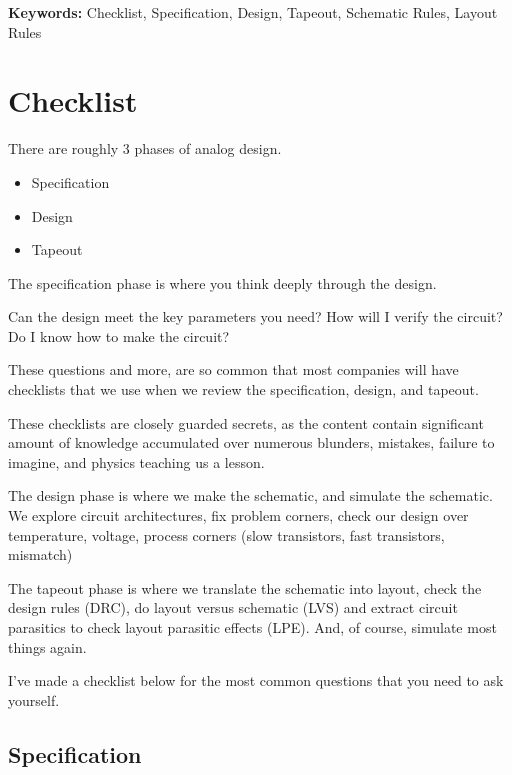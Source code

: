 \textbf{Keywords:} Checklist, Specification, Design, Tapeout, Schematic
Rules, Layout Rules

\section{Checklist}\label{checklist}

There are roughly 3 phases of analog design.

\begin{itemize}
\tightlist
\item
  Specification
\item
  Design
\item
  Tapeout
\end{itemize}

The specification phase is where you think deeply through the design.

Can the design meet the key parameters you need? How will I verify the
circuit? Do I know how to make the circuit?

These questions and more, are so common that most companies will have
checklists that we use when we review the specification, design, and
tapeout.

These checklists are closely guarded secrets, as the content contain
significant amount of knowledge accumulated over numerous blunders,
mistakes, failure to imagine, and physics teaching us a lesson.

The design phase is where we make the schematic, and simulate the
schematic. We explore circuit architectures, fix problem corners, check
our design over temperature, voltage, process corners (slow transistors,
fast transistors, mismatch)

The tapeout phase is where we translate the schematic into layout, check
the design rules (DRC), do layout versus schematic (LVS) and extract
circuit parasitics to check layout parasitic effects (LPE). And, of
course, simulate most things again.

I've made a checklist below for the most common questions that you need
to ask yourself.

\subsection{Specification}\label{specification}

